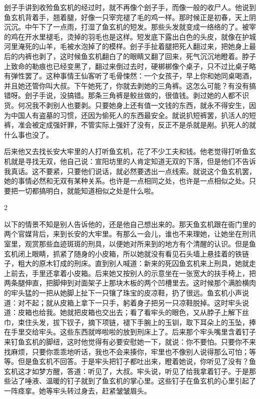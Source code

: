 刽子手讲到收殓鱼玄机的经过时，就不再像个刽子手，而像一般的收尸人。他说到鱼玄机背着手，翘着腿，好像一只宰完褪了毛的鸡一样。那时候正是初春，天上阴沉沉。中午下了一点雨，打湿了鱼玄机的短发。那些头发就变成一络络的了。被宰的鸡在开水里褪毛，烫掉的羽毛也是这样。短发底下露出白色的头皮，就像在护城河里淹死的山羊，毛被水泡掉了的模样。刽子手扯着腿把死人翻过来，把她身上最后的内裤也剥了，这时候鱼玄机翻白了的眼睛又翻了回来，死气沉沉地瞪着。脖子上致命的勒痕也已经变黑了，翻过来倒过去时，硬梆梆像个桌子，只不过比桌子略有弹性罢了。这种事情王仙客听了毛骨悚然：一个女孩子，早上你和她同桌喝酒，并且她还管你叫大叔。下午她死了，你就去剥她的三角裤。这怎么可能？有没有搞错呀。刽子手说，没搞错。那条三角裤是鲛丝做的，很值钱。剥过她的人都不识货。何况我不剥别人也要剥。只要她身上还有值一文钱的东西，就永不得安生，因为中国人有盗墓的习惯，还因为偷死人的东西最安全。就说扒短裤罢，扒活人的短裤，准会被定成强奸罪，不管实际上强奸了没有，反正不是杀就是剐。扒死人的就什么事也没了。 

后来他又去找长安大牢里的人打听鱼玄机，花了不少工夫和钱。他老觉得打听鱼玄机就是寻找无双，他自己说：宣阳坊里的人肯定知道无双的下落，但是他们不告诉我真话。这不要紧，只要他们说话，就必然要透出一点线索。就说这个鱼玄机罢，她的事情必然和无双有某种关系。也许是一点相同之处，也许是一点相似之处。只要把一切都搞明白，就能知道相似之处是什么啦。 

2 

以下的情景不知是别人告诉他的，还是他自己想出来的。那天鱼玄机跟在衙门里的两个官媒背后，来到长安的大牢里。有那么一会儿，谁也不来理她，让她坐在刑讯室里，观赏那些血迹斑斑的刑具，以便她对所来到的地方有个清醒的认识。但是鱼玄机闭上眼睛，抓紧了随身的小皮箱，所以她就没有看见石头墙上悬挂着的铁链子，粗大的原木钉成的刑床。直到别人喊道：新来的死囚鱼玄机来上刑具，她就走上前去，手里还拿着小皮箱。后来她又按别人的示意坐在一张宽大的扶手椅上，把两条腿伸直，把脚伸到对面架子上那块木板的两个凹槽里去。这时候那个满脸横肉的牢头猛的一把从她脚上扯下一只镶了珠宝的皮凉鞋，扔了很远。鱼玄机小声说道：对不起；就从皮箱上拿下一只手，躬着身子把另一只凉鞋脱掉。这时牢头说道：皮箱也给我。她就把皮箱也交出去；看了看牢头的眼色，又从脖子上解下丝巾，束住头发，拔下钗子，摘下项链，褪下手腕上的玉钏，取下耳朵上的玉坠，捧在手里交给牢头。这些东西就哗啦啦的放到刑床上了。后来那个牢头嘴里含着钉子来钉鱼玄机的脚纽，这时他觉得有必要安慰她一下，就说：你不要怕。只要你不来找麻烦，只要你乖乖地听话，我也不会来揍你，牢里也不像别人说得那么可怕；等等。但是鱼玄机不回答。于是牢头把钉子都吐出来，瞪着她说，你听见了没有？鱼玄机这才如梦方醒，答道：听见了，大叔。牢头说，听见了给我拿着钉子。于是那些沾了唾液、温暖的钉子就到了鱼玄机的掌心里。这些钉子在鱼玄机的心里引起了一阵痉挛。她等牢头转过身去，赶紧皱皱眉头。 

